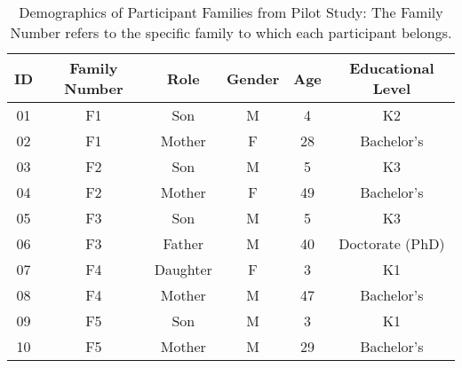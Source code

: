 \begin{table*}[tb]
\vspace{-0.5cm}
\centering
\tabcolsep=0.5cm
\begin{tabular}{cccccc}
\hline
\textbf{ID} & \textbf{Family Number} & \textbf{Role} & \textbf{Gender} & \textbf{Age} & \textbf{Educational Level} \\\hline
01 & F1 & Son      & M & 4  & K2         \\\rowcolor{customcolor}
02 & F1 & Mother   & F & 28 & Bachelor’s \\
03 & F2 & Son      & M & 5  & K3         \\\rowcolor{customcolor}
04 & F2 & Mother   & F & 49 & Bachelor’s \\
05 & F3 & Son      & M & 5  & K3         \\\rowcolor{customcolor}
06 & F3 & Father   & M & 40 & Doctorate (PhD) \\
07 & F4 & Daughter & F & 3  & K1         \\\rowcolor{customcolor}
08 & F4 & Mother   & M & 47 & Bachelor’s \\
09 & F5 & Son      & M & 3  & K1         \\\rowcolor{customcolor}
10 & F5 & Mother   & M & 29 & Bachelor’s \\\hline
\end{tabular}
\caption{Demographics of Participant Families from Pilot Study: The Family Number refers to the specific family to which each participant belongs.}
\label{tab:familystudy}
\end{table*}


